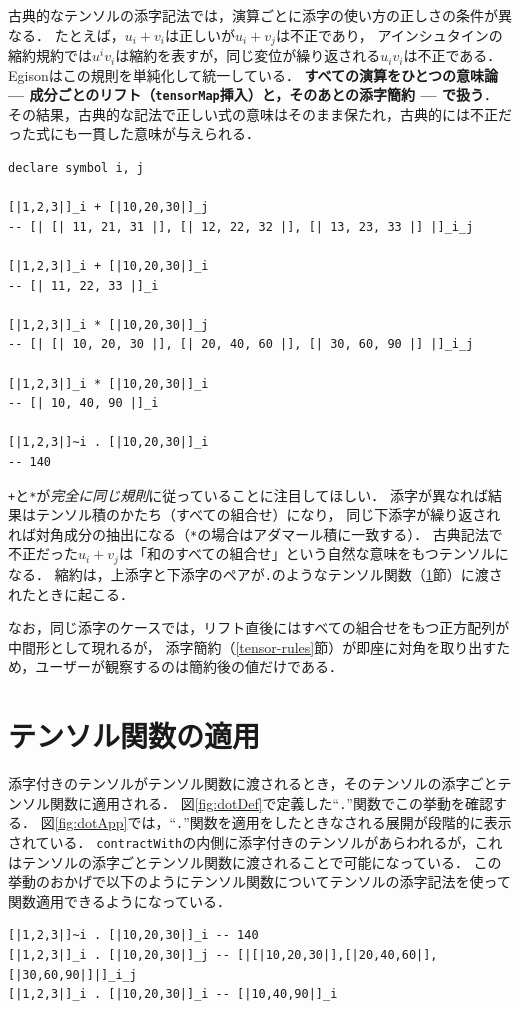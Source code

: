 古典的なテンソルの添字記法では，演算ごとに添字の使い方の正しさの条件が異なる．
たとえば，$u_i + v_i$は正しいが$u_i + v_j$は不正であり，
アインシュタインの縮約規約では$u^i v_i$は縮約を表すが，同じ変位が繰り返される$u_i v_i$は不正である．
Egisonはこの規則を単純化して統一している．
\textbf{すべての演算をひとつの意味論 --- 成分ごとのリフト（\lstinline{tensorMap}挿入）と，そのあとの添字簡約 --- で扱う}．
その結果，古典的な記法で正しい式の意味はそのまま保たれ，古典的には不正だった式にも一貫した意味が与えられる．
\begin{lstlisting}[language=egison,numbers=none]
declare symbol i, j

[|1,2,3|]_i + [|10,20,30|]_j
-- [| [| 11, 21, 31 |], [| 12, 22, 32 |], [| 13, 23, 33 |] |]_i_j

[|1,2,3|]_i + [|10,20,30|]_i
-- [| 11, 22, 33 |]_i

[|1,2,3|]_i * [|10,20,30|]_j
-- [| [| 10, 20, 30 |], [| 20, 40, 60 |], [| 30, 60, 90 |] |]_i_j

[|1,2,3|]_i * [|10,20,30|]_i
-- [| 10, 40, 90 |]_i

[|1,2,3|]~i . [|10,20,30|]_i
-- 140
\end{lstlisting}
\lstinline{+}と\lstinline{*}が\emph{完全に同じ規則}に従っていることに注目してほしい．
添字が異なれば結果はテンソル積のかたち（すべての組合せ）になり，
同じ下添字が繰り返されれば対角成分の抽出になる（\lstinline{*}の場合はアダマール積に一致する）．
古典記法で不正だった$u_i + v_j$は「和のすべての組合せ」という自然な意味をもつテンソルになる．
縮約は，上添字と下添字のペアが\lstinline{.}のようなテンソル関数（\ref{tensor-tensorfunc}節）に渡されたときに起こる．

なお，同じ添字のケースでは，リフト直後にはすべての組合せをもつ正方配列が中間形として現れるが，
添字簡約（\ref{tensor-rules}節）が即座に対角を取り出すため，ユーザーが観察するのは簡約後の値だけである．

\section{テンソル関数の適用}\label{tensor-tensorfunc}

添字付きのテンソルがテンソル関数に渡されるとき，そのテンソルの添字ごとテンソル関数に適用される．
図\ref{fig:dotDef}で定義した``\lstinline{.}''関数でこの挙動を確認する．
図\ref{fig:dotApp}では，``\lstinline{.}''関数を適用をしたときなされる展開が段階的に表示されている．
\lstinline{contractWith}の内側に添字付きのテンソルがあらわれるが，これはテンソルの添字ごとテンソル関数に渡されることで可能になっている．
この挙動のおかげで以下のようにテンソル関数についてテンソルの添字記法を使って関数適用できるようになっている．
\begin{lstlisting}[language=egison,numbers=none]
[|1,2,3|]~i . [|10,20,30|]_i -- 140
[|1,2,3|]_i . [|10,20,30|]_j -- [|[|10,20,30|],[|20,40,60|],[|30,60,90|]|]_i_j
[|1,2,3|]_i . [|10,20,30|]_i -- [|10,40,90|]_i
\end{lstlisting}

